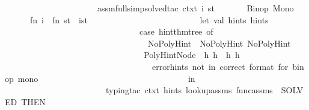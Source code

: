 \begin{isabellebody}
\ \ \ \ \ \ \ \ \ \ \ \ \ \ \ \ \ \ \ \ \ \ assm{\isacharunderscore}{\kern0pt}full{\isacharunderscore}{\kern0pt}simp{\isacharunderscore}{\kern0pt}solved{\isacharunderscore}{\kern0pt}tac\ ctxt{\isacharparenright}{\kern0pt}\ i\ st{\isacharcomma}{\kern0pt}\isanewline
\ \ \ \ \ \ {\isacharparenleft}{\kern0pt}{\isacharasterisk}{\kern0pt}\ Binop\ Mono\ {\isacharasterisk}{\kern0pt}{\isacharparenright}{\kern0pt}\isanewline
\ \ \ \ \ \ fn\ i\ {\isacharequal}{\kern0pt}{\isachargreater}{\kern0pt}\ fn\ st\ {\isacharequal}{\kern0pt}{\isachargreater}{\kern0pt}\ {\isacharparenleft}{\kern0pt}i{\isacharcomma}{\kern0pt}st{\isacharparenright}{\kern0pt}\ {\isacharbar}{\kern0pt}{\isacharminus}{\kern0pt}{\isachargreater}{\kern0pt}\ {\isacharparenleft}{\kern0pt}\isanewline
\ \ \ \ \ \ \ \ \ \ \ \ \ \ \ \ \ \ \ \ \ \ \ \ let\ val\ {\isacharparenleft}{\kern0pt}hints{}{\isacharcomma}{\kern0pt}\ hints{}{\isacharparenright}{\kern0pt}\ {\isacharequal}{\kern0pt}\ \isanewline
\ \ \ \ \ \ \ \ \ \ \ \ \ \ \ \ \ \ \ \ \ \ \ \ \ \ \ \ \ \ \ \ case\ hint{\isacharunderscore}{\kern0pt}thm{\isacharunderscore}{\kern0pt}tree\ of\isanewline
\ \ \ \ \ \ \ \ \ \ \ \ \ \ \ \ \ \ \ \ \ \ \ \ \ \ \ \ \ \ \ \ \ \ NoPolyHint\ {\isacharequal}{\kern0pt}{\isachargreater}{\kern0pt}\ {\isacharparenleft}{\kern0pt}NoPolyHint{\isacharcomma}{\kern0pt}\ NoPolyHint{\isacharparenright}{\kern0pt}\isanewline
\ \ \ \ \ \ \ \ \ \ \ \ \ \ \ \ \ \ \ \ \ \ \ \ \ \ \ \ \ \ \ \ {\isacharbar}{\kern0pt}\ PolyHintNode\ {\isacharparenleft}{\kern0pt}{\isacharunderscore}{\kern0pt}{\isacharcomma}{\kern0pt}\ {\isacharparenleft}{\kern0pt}{\isacharbrackleft}{\kern0pt}h{}{\isacharcomma}{\kern0pt}\ h{}{\isacharbrackright}{\kern0pt}{\isacharparenright}{\kern0pt}{\isacharparenright}{\kern0pt}\ {\isacharequal}{\kern0pt}{\isachargreater}{\kern0pt}\ {\isacharparenleft}{\kern0pt}h{}{\isacharcomma}{\kern0pt}\ h{}{\isacharparenright}{\kern0pt}\isanewline
\ \ \ \ \ \ \ \ \ \ \ \ \ \ \ \ \ \ \ \ \ \ \ \ \ \ \ \ \ \ \ \ {\isacharbar}{\kern0pt}\ {\isacharunderscore}{\kern0pt}\ {\isacharequal}{\kern0pt}{\isachargreater}{\kern0pt}\ error{\isacharparenleft}{\kern0pt}{\isachardoublequote}{\kern0pt}hints\ not\ in\ correct\ format\ for\ binop\ mono{\isachardoublequote}{\kern0pt}{\isacharparenright}{\kern0pt}\isanewline
\isanewline
\ \ \ \ \ \ \ \ \ \ \ \ \ \ \ \ \ \ \ \ \ \ \ \ \ \ \ \ \ \ \ \ \ \ \ in\isanewline
\ \ \ \ \ \ \ \ \ \ \ \ \ \ \ \ \ \ \ \ \ \ \ \ {\isacharparenleft}{\kern0pt}typing{\isacharunderscore}{\kern0pt}tac\ ctxt\ hints{}\ lookup{\isacharunderscore}{\kern0pt}assms\ func{\isacharunderscore}{\kern0pt}assms\ {\isacharbar}{\kern0pt}{\isachargreater}{\kern0pt}\ SOLVED{\isacharprime}{\kern0pt}{\isacharparenright}{\kern0pt}\ THEN{\isacharprime}{\kern0pt}\isanewline

\end{isabellebody}
